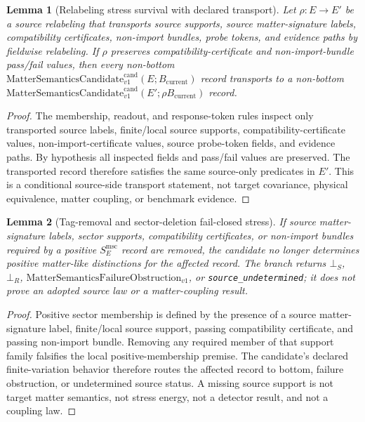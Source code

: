 \documentclass[11pt]{article}
\newcommand{\Bcur}{B_{\mathrm{current}}}
\newcommand{\MSCand}{\mathrm{MatterSemanticsCandidate}^{\mathrm{cand}}_{v1}}
\newcommand{\FailureObs}{\mathrm{MatterSemanticsFailureObstruction}_{v1}}
\newcommand{\BottomS}{\bot_S}
\newcommand{\BottomR}{\bot_R}
\newtheorem{lemma}{Lemma}
\begin{document}
\begin{lemma}[Relabeling stress survival with declared transport]
Let \(\rho:E\to E'\) be a source relabeling that transports source supports,
source matter-signature labels, compatibility certificates, non-import
bundles, probe tokens, and evidence paths by fieldwise relabeling. If \(\rho\)
preserves compatibility-certificate and non-import-bundle pass/fail values,
then every non-bottom \(\MSCand(E;\Bcur)\) record transports to a non-bottom
\(\MSCand(E';\rho\Bcur)\) record.
\end{lemma}

\begin{proof}
The membership, readout, and response-token rules inspect only transported
source labels, finite/local source supports, compatibility-certificate values,
non-import-certificate values, source probe-token fields, and evidence paths.
By hypothesis all inspected fields and pass/fail values are preserved. The
transported record therefore satisfies the same source-only predicates in
\(E'\). This is a conditional source-side transport statement, not target
covariance, physical equivalence, matter coupling, or benchmark evidence.
\end{proof}

\begin{lemma}[Tag-removal and sector-deletion fail-closed stress]
If source matter-signature labels, sector supports, compatibility
certificates, or non-import bundles required by a positive
\(S_E^{\mathrm{msc}}\) record are removed, the candidate no longer determines
positive matter-like distinctions for the affected record. The branch returns
\(\BottomS\), \(\BottomR\), \(\FailureObs\), or
\texttt{source\_undetermined}; it does not prove an adopted source law or a
matter-coupling result.
\end{lemma}

\begin{proof}
Positive sector membership is defined by the presence of a source
matter-signature label, finite/local source support, passing compatibility
certificate, and passing non-import bundle. Removing any required member of
that support family falsifies the local positive-membership premise. The
candidate's declared finite-variation behavior therefore routes the affected
record to bottom, failure obstruction, or undetermined source status. A missing
source support is not target matter semantics, not stress energy, not a
detector result, and not a coupling law.
\end{proof}
\end{document}
